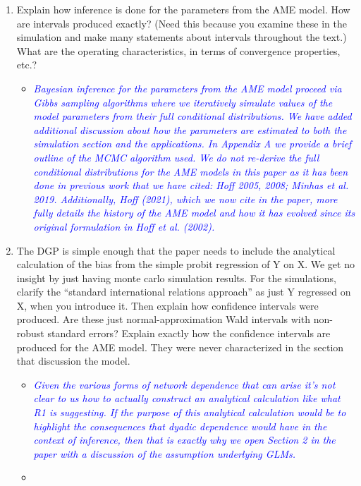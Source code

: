 \begin{enumerate}
\begin{itemize}
{{		}}
	\end{itemize}
	\item Explain how inference is done for the parameters from the AME model. How are intervals produced exactly? (Need this because you examine these in the simulation and make many statements about intervals throughout the text.)  What are the operating characteristics, in terms of convergence properties, etc.?
	\begin{itemize}
		\item  \emph{ \textcolor{blue}{
		Bayesian inference for the parameters from the AME model proceed via Gibbs sampling algorithms where we iteratively simulate values of the model parameters from their full conditional distributions. We have added additional discussion about how the parameters are estimated to both the simulation section and the applications. In Appendix A we provide a brief outline of the MCMC algorithm used. We do not re-derive the full conditional distributions for the AME models in this paper as it has been done in previous work that we have cited: Hoff 2005, 2008; Minhas et al. 2019. Additionally, Hoff (2021), which we now cite in the paper, more fully details the history of the AME model and how it has evolved since its original formulation in Hoff et al. (2002).
		}}
	\end{itemize}
	\item The DGP is simple enough that the paper needs to include the analytical calculation of the bias from the simple probit regression of Y on X.  We get no insight by just having monte carlo simulation results. For the simulations, clarify the ``standard international relations approach'' as just Y regressed on X, when you introduce it. Then explain how confidence intervals were produced. Are these just normal-approximation Wald intervals with non-robust standard errors? Explain exactly how the confidence intervals are produced for the AME model.  They were never characterized in the section that discussion the model.
	\begin{itemize}
		\item  \emph{ \textcolor{blue}{
		Given the various forms of network dependence that can arise it's not clear to us how to actually construct an analytical calculation like what R1 is suggesting. If the purpose of this analytical calculation would be to highlight the consequences that dyadic dependence would have in the context of inference, then that is exactly why we open Section 2 in the paper with a discussion of the assumption underlying GLMs. }}
		\item  \emph{ \textcolor{blue}{
}}
\end{itemize}
\end{enumerate}
